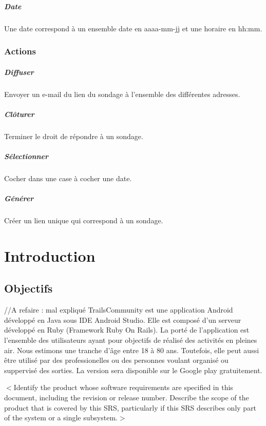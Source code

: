 \documentclass[titlepage]{report}
\begin{document}
\paragraph{Date} Une date correspond à un ensemble date en aaaa-mm-jj et une horaire en hh:mm.

\subsection{Actions}
\paragraph{Diffuser} Envoyer un e-mail du lien du sondage à l’ensemble des différentes adresses.
\paragraph{Clôturer} Terminer le droit de répondre à un sondage.
\paragraph{Sélectionner} Cocher dans une case à cocher une date.
\paragraph{Générer} Créer un lien unique qui correspond à un sondage.


\chapter{Introduction}

\section{Objectifs}

//A refaire : mal expliqué
TrailsCommunity est une application Android développé en Java sous IDE Android Studio. Elle est composé d'un serveur développé en Ruby (Framework Ruby On Rails).
La porté de l'application est l'ensemble des utilisateurs ayant pour objectifs de réalisé des activités en pleines air. Nous estimons une tranche d'âge entre 18 à 80 ans.
Toutefois, elle peut aussi être utilisé par des professionelles ou des personnes voulant organisé ou suppervisé des sorties.
La version sera disponible sur le Google play gratuitement. 

$<$Identify the product whose software requirements are specified in this 
document, including the revision or release number. Describe the scope of the 
product that is covered by this SRS, particularly if this SRS describes only 
part of the system or a single subsystem.$>$
\end{document}
